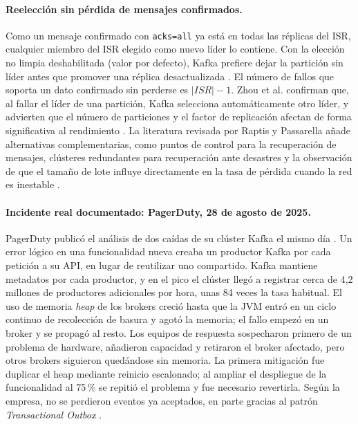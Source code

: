 \documentclass[11pt,a4paper]{article}
\begin{document}
\paragraph{Reelección sin pérdida de mensajes confirmados.}
Como un mensaje confirmado con \texttt{acks=all} ya está en todas las réplicas del ISR, cualquier miembro del ISR elegido como nuevo líder lo contiene. Con la elección no limpia deshabilitada (valor por defecto), Kafka prefiere dejar la partición sin líder antes que promover una réplica desactualizada \cite{kafkadocs}. El número de fallos que soporta un dato confirmado sin perderse es $|ISR|-1$. Zhou et al. confirman que, al fallar el líder de una partición, Kafka selecciona automáticamente otro líder, y advierten que el número de particiones y el factor de replicación afectan de forma significativa al rendimiento \cite{zhou2024distributed}. La literatura revisada por Raptis y Passarella añade alternativas complementarias, como puntos de control para la recuperación de mensajes, clústeres redundantes para recuperación ante desastres y la observación de que el tamaño de lote influye directamente en la tasa de pérdida cuando la red es inestable \cite{raptis2023survey}.

\paragraph{Incidente real documentado: PagerDuty, 28 de agosto de 2025.}
PagerDuty publicó el análisis de dos caídas de su clúster Kafka el mismo día \cite{pagerduty2025}. Un error lógico en una funcionalidad nueva creaba un productor Kafka por cada petición a su API, en lugar de reutilizar uno compartido. Kafka mantiene metadatos por cada productor, y en el pico el clúster llegó a registrar cerca de 4,2 millones de productores adicionales por hora, unas 84 veces la tasa habitual. El uso de memoria \emph{heap} de los brokers creció hasta que la JVM entró en un ciclo continuo de recolección de basura y agotó la memoria; el fallo empezó en un broker y se propagó al resto. Los equipos de respuesta sospecharon primero de un problema de hardware, añadieron capacidad y retiraron el broker afectado, pero otros brokers siguieron quedándose sin memoria. La primera mitigación fue duplicar el heap mediante reinicio escalonado; al ampliar el despliegue de la funcionalidad al 75\,\% se repitió el problema y fue necesario revertirla. Según la empresa, no se perdieron eventos ya aceptados, en parte gracias al patrón \emph{Transactional Outbox} \cite{pagerduty2025}.
\end{document}
